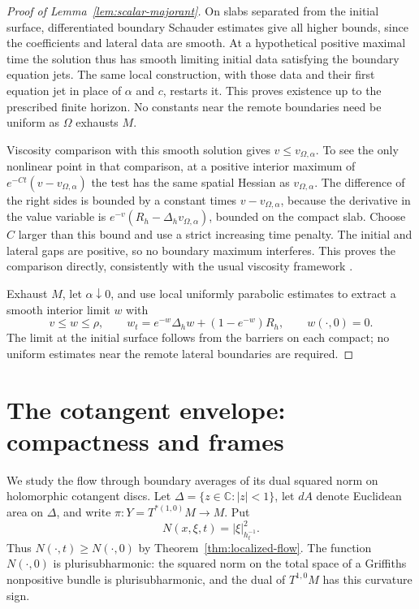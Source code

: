 \documentclass[11pt]{article}
\theoremstyle{definition}
\theoremstyle{remark}
\newcommand{\C}{\mathbb C}
\numberwithin{equation}{section}
\begin{document}
\begin{proof}[Proof of Lemma~\ref{lem:scalar-majorant}]
On slabs separated from the initial surface, differentiated
boundary Schauder estimates give all higher bounds, since the
coefficients and lateral data are smooth.  At a hypothetical
positive maximal time the solution thus has smooth limiting
initial data satisfying the boundary equation jets.  The same
local construction, with those data and their first equation jet
in place of $\alpha$ and $c$, restarts it.  This proves existence
up to the prescribed finite horizon.  No constants near the
remote boundaries need be uniform as $\Omega$ exhausts $M$.

Viscosity comparison with this smooth solution gives
$v\le v_{\Omega,\alpha}$.  To see the only nonlinear point in that
comparison, at a positive interior maximum of
$e^{-Ct}(v-v_{\Omega,\alpha})$ the test has the same spatial Hessian
as $v_{\Omega,\alpha}$.  The difference of the right sides is bounded
by a constant times $v-v_{\Omega,\alpha}$, because the derivative
in the value variable is
$e^{-v}(R_h-\Delta_hv_{\Omega,\alpha})$, bounded on the compact slab.
Choose $C$ larger than this bound and use a strict increasing time
penalty.  The initial and lateral gaps are positive, so no boundary
maximum interferes.  This proves the comparison directly, consistently
with the usual viscosity framework \cite{CIL}.

Exhaust $M$, let $\alpha\downarrow0$, and use local uniformly
parabolic estimates to extract a smooth interior limit $w$ with
\[
 v\le w\le\rho,\qquad
 w_t=e^{-w}\Delta_hw+(1-e^{-w})R_h,
 \qquad w(\cdot,0)=0.
\]
The limit at the initial surface follows from the barriers on each
compact; no uniform estimates near the remote lateral boundaries
are required.
\end{proof}

\section{The cotangent envelope: compactness and frames}
\label{sec:discs}

We study the flow through boundary averages of its dual squared norm on
holomorphic cotangent discs.  Let $\Delta=\{z\in\C:|z|<1\}$, let $dA$
denote Euclidean area on $\Delta$, and write
$\pi:Y=T^{*(1,0)}M\to M$.  Put
\[
 N(x,\xi,t)=|\xi|^2_{h_t^{-1}}.
\]
Thus $N(\cdot,t)\ge N(\cdot,0)$ by
Theorem~\ref{thm:localized-flow}.  The function $N(\cdot,0)$ is
plurisubharmonic: the squared norm on the total space of a Griffiths
nonpositive bundle is plurisubharmonic, and the dual of $T^{1,0}M$ has
this curvature sign.
\end{document}
